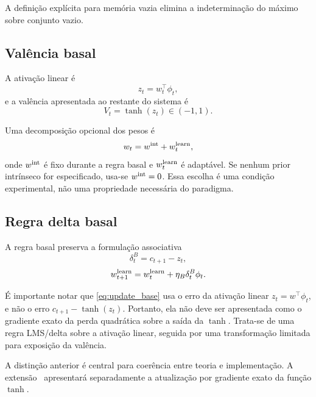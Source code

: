 A definição explícita para memória vazia elimina a indeterminação do máximo sobre conjunto vazio.

\subsection{Valência basal}

A ativação linear é
\begin{equation}
z_t=w_t^\top\phi_t,
\label{eq:activation_base}
\end{equation}
e a valência apresentada ao restante do sistema é
\begin{equation}
V_t=\tanh(z_t)\in(-1,1).
\label{eq:valence_base}
\end{equation}

Uma decomposição opcional dos pesos é
\begin{equation}
w_t=w^{\rm int}+w_t^{\rm learn},
\label{eq:intrinsic_learned}
\end{equation}
onde \(w^{\rm int}\) é fixo durante a regra basal e \(w_t^{\rm learn}\) é adaptável. Se nenhum prior intrínseco for especificado, usa-se \(w^{\rm int}=0\). Essa escolha é uma condição experimental, não uma propriedade necessária do paradigma.

\subsection{Regra delta basal}

A regra basal preserva a formulação associativa
\begin{equation}
\delta_t^{B}=c_{t+1}-z_t,
\label{eq:delta_base}
\end{equation}
\begin{equation}
w_{t+1}^{\rm learn}=w_t^{\rm learn}+\eta_B\delta_t^B\phi_t.
\label{eq:update_base}
\end{equation}

É importante notar que \eqref{eq:update_base} usa o erro da ativação linear \(z_t=w^\top\phi_t\), e não o erro \(c_{t+1}-\tanh(z_t)\). Portanto, ela não deve ser apresentada como o gradiente exato da perda quadrática sobre a saída da \(\tanh\). Trata-se de uma regra LMS/delta sobre a ativação linear, seguida por uma transformação limitada para exposição da valência.

\begin{remark}
A distinção anterior é central para coerência entre teoria e implementação. A extensão \EVPM\ apresentará separadamente a atualização por gradiente exato da função \(\tanh\).
\end{remark}

